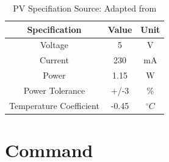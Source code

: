 \documentclass[10pt,twoside]{article}
\begin{document}
\begin{appendices}
\begin{table}[htb]
    \centering
    \renewcommand{\arraystretch}{1.3}
    \begin{tabular}{||c|c|c||}
    \hline
    Specification & Value & Unit \\ [0.5ex]
    \hline \hline
        Voltage  & 5 & V\\
        Current & 230 & mA\\
        Power & 1.15 & W \\
        Power Tolerance & +/-3 & \% \\
        Temperature Coefficient & -0.45 & $^{\circ} C$ \\
        \hline
    \end{tabular}
    \caption{PV Specifiation \quad Source: Adapted from \cite{NoTitle}}
    \label{tab:PVSpecification}
\end{table}



\newpage
\section{Command}

\setcounter{figure}{0}  %
\setcounter{table}{0}   %

\end{appendices}



\end{document}
